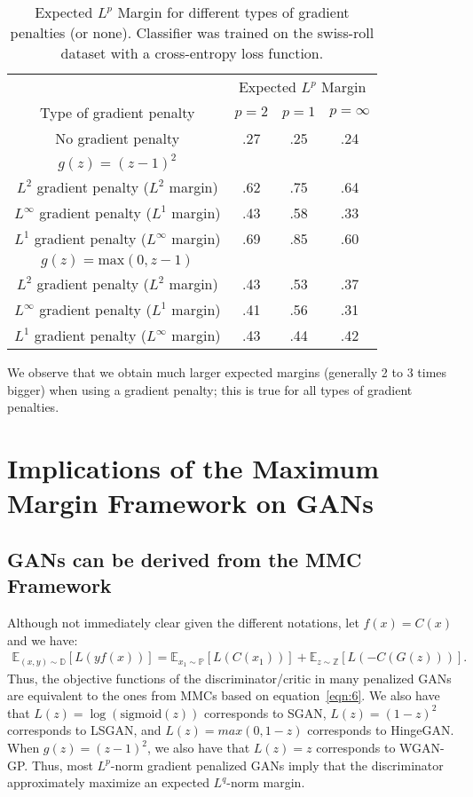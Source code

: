 \documentclass{article}
\def\eqref#1{equation~\ref{#1}}
\begin{document}
\begin{table}[!ht]
	\caption{Expected $L^p$ Margin for different types of gradient penalties (or none). Classifier was trained on the swiss-roll dataset with a cross-entropy loss function.}
	\label{tab:9}
	\centering
	\begin{tabular}{cccc}
		\toprule
		& \multicolumn{3}{c}{Expected $L^p$ Margin} \\
		Type of gradient penalty & $p=2$ & $p=1$ & $p=\infty$ \\
		\cmidrule(){1-4}
		No gradient penalty & .27 & .25 & .24 \\
		\cmidrule(){1-4}
		$g(z)=(z-1)^2$ \\
		\cmidrule(){1-4}
        $L^2$ gradient penalty ($L^2$ margin) & .62 & .75 & .64 \\
        $L^\infty$ gradient penalty ($L^1$ margin) & .43 & .58 & .33 \\
        $L^1$ gradient penalty ($L^\infty$ margin) & .69 & .85 & .60 \\
        \cmidrule(){1-4}
        $g(z)=\text{max}(0,z-1)$ \\
        \cmidrule(){1-4}
        $L^2$ gradient penalty ($L^2$ margin) & .43 & .53 & .37 \\
        $L^\infty$ gradient penalty ($L^1$ margin) & .41 & .56 & .31 \\
        $L^1$ gradient penalty ($L^\infty$ margin) & .43 & .44 & .42 \\
		\bottomrule
	\end{tabular}
\end{table}

We observe that we obtain much larger expected margins (generally 2 to 3 times bigger) when using a gradient penalty; this is true for all types of gradient penalties.

\section{Implications of the Maximum Margin Framework on GANs}
\label{sec:5}

\subsection{GANs can be derived from the MMC Framework}
\label{sec:5.1}

Although not immediately clear given the different notations, let $f(x)=C(x)$ and we have:
\begin{align*}
\mathbb{E}_{(x,y)\sim \mathbb{D}}\left[L(yf(x))\right] = \mathbb{E}_{x_1 \sim \mathbb{P}}[L(C(x_1))] + \mathbb{E}_{z \sim \mathbb{Z}}[L(-C(G(z)))].
\end{align*}
Thus, the objective functions of the discriminator/critic in many penalized GANs are equivalent to the ones from MMCs based on \eqref{eqn:6}. We also have that $L(z)=\log(\text{sigmoid}(z))$ corresponds to SGAN, $L(z)=(1-z)^2$ corresponds to LSGAN, and $L(z)=max(0,1-z)$ corresponds to HingeGAN. When $g(z)=(z-1)^2$, we also have that $L(z)=z$ corresponds to WGAN-GP. Thus, most $L^p$-norm gradient penalized GANs imply that the discriminator approximately maximize an expected $L^q$-norm margin.
\end{document}
